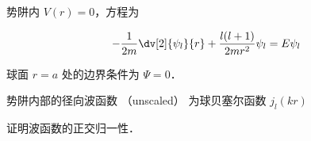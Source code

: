 
\begin{issues}
\issueDraft
\end{issues}


势阱内 $V(r) = 0$，方程为

\begin{equation}
-\frac{1}{2m} \dv[2]{\psi_l}{r} + \frac{l(l + 1)}{2mr^2}\psi_l = E\psi_l
\end{equation}

球面 $r = a$ 处的边界条件为 $\Psi = 0$．

势阱内部的径向波函数 （unscaled） 为球贝塞尔函数 $j_l(kr)$

证明波函数的正交归一性．
